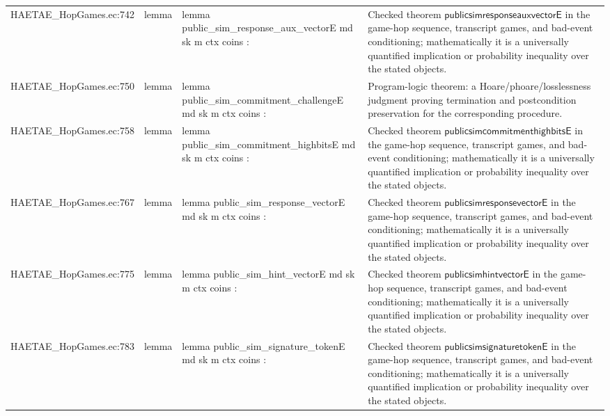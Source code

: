 \documentclass[10pt]{article}
\begin{document}
\begin{longtable}{L{0.11\textwidth}L{0.055\textwidth}L{0.385\textwidth}L{0.41\textwidth}}
HAETAE\_\allowbreak{}HopGames.\allowbreak{}ec:\allowbreak{}742 & lemma & {\ttfamily\scriptsize lemma public\_\allowbreak{}sim\_\allowbreak{}response\_\allowbreak{}aux\_\allowbreak{}vectorE md sk m ctx coins :} & Checked theorem $\mathsf{publicsimresponseauxvectorE}$ in the game-hop sequence, transcript games, and bad-event conditioning; mathematically it is a universally quantified implication or probability inequality over the stated objects. \\
HAETAE\_\allowbreak{}HopGames.\allowbreak{}ec:\allowbreak{}750 & lemma & {\ttfamily\scriptsize lemma public\_\allowbreak{}sim\_\allowbreak{}commitment\_\allowbreak{}challengeE md sk m ctx coins :} & Program-logic theorem: a Hoare/phoare/losslessness judgment proving termination and postcondition preservation for the corresponding procedure. \\
HAETAE\_\allowbreak{}HopGames.\allowbreak{}ec:\allowbreak{}758 & lemma & {\ttfamily\scriptsize lemma public\_\allowbreak{}sim\_\allowbreak{}commitment\_\allowbreak{}highbitsE md sk m ctx coins :} & Checked theorem $\mathsf{publicsimcommitmenthighbitsE}$ in the game-hop sequence, transcript games, and bad-event conditioning; mathematically it is a universally quantified implication or probability inequality over the stated objects. \\
HAETAE\_\allowbreak{}HopGames.\allowbreak{}ec:\allowbreak{}767 & lemma & {\ttfamily\scriptsize lemma public\_\allowbreak{}sim\_\allowbreak{}response\_\allowbreak{}vectorE md sk m ctx coins :} & Checked theorem $\mathsf{publicsimresponsevectorE}$ in the game-hop sequence, transcript games, and bad-event conditioning; mathematically it is a universally quantified implication or probability inequality over the stated objects. \\
HAETAE\_\allowbreak{}HopGames.\allowbreak{}ec:\allowbreak{}775 & lemma & {\ttfamily\scriptsize lemma public\_\allowbreak{}sim\_\allowbreak{}hint\_\allowbreak{}vectorE md sk m ctx coins :} & Checked theorem $\mathsf{publicsimhintvectorE}$ in the game-hop sequence, transcript games, and bad-event conditioning; mathematically it is a universally quantified implication or probability inequality over the stated objects. \\
HAETAE\_\allowbreak{}HopGames.\allowbreak{}ec:\allowbreak{}783 & lemma & {\ttfamily\scriptsize lemma public\_\allowbreak{}sim\_\allowbreak{}signature\_\allowbreak{}tokenE md sk m ctx coins :} & Checked theorem $\mathsf{publicsimsignaturetokenE}$ in the game-hop sequence, transcript games, and bad-event conditioning; mathematically it is a universally quantified implication or probability inequality over the stated objects. \\

\end{longtable}
\end{document}
